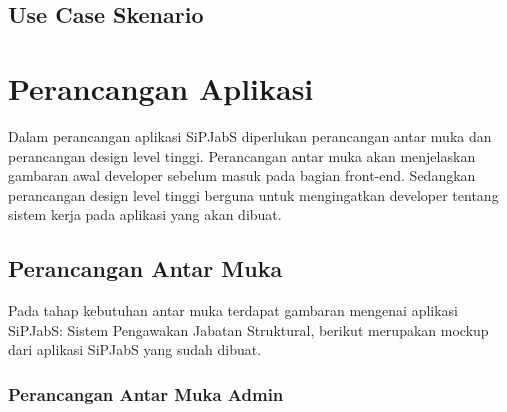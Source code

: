 \subsection{Use Case Skenario}

\section{Perancangan Aplikasi}
Dalam perancangan aplikasi SiPJabS diperlukan perancangan antar muka dan perancangan design level tinggi. Perancangan antar muka akan menjelaskan gambaran awal  developer sebelum masuk pada bagian front-end.  Sedangkan perancangan design level tinggi berguna untuk mengingatkan developer tentang sistem kerja pada aplikasi yang akan dibuat.


\subsection{Perancangan Antar Muka}
Pada tahap kebutuhan antar muka terdapat gambaran mengenai aplikasi SiPJabS: Sistem Pengawakan Jabatan Struktural, berikut merupakan mockup dari aplikasi SiPJabS yang sudah dibuat.

\subsubsection{Perancangan Antar Muka Admin}

